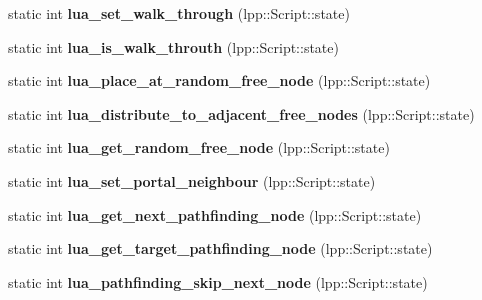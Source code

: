 \begin{DoxyCompactItemize}
\item 
static int {\bfseries lua\+\_\+set\+\_\+walk\+\_\+through} (lpp\+::\+Script\+::state)\hypertarget{class_lua_interface_a47ead731655af1ce33519f92667daf43}{}\label{class_lua_interface_a47ead731655af1ce33519f92667daf43}

\item 
static int {\bfseries lua\+\_\+is\+\_\+walk\+\_\+throuth} (lpp\+::\+Script\+::state)\hypertarget{class_lua_interface_ab39a1407244b62d9abbbbe49570dd303}{}\label{class_lua_interface_ab39a1407244b62d9abbbbe49570dd303}

\item 
static int {\bfseries lua\+\_\+place\+\_\+at\+\_\+random\+\_\+free\+\_\+node} (lpp\+::\+Script\+::state)\hypertarget{class_lua_interface_ac2e21719b40a3c50df8a9b1771355c68}{}\label{class_lua_interface_ac2e21719b40a3c50df8a9b1771355c68}

\item 
static int {\bfseries lua\+\_\+distribute\+\_\+to\+\_\+adjacent\+\_\+free\+\_\+nodes} (lpp\+::\+Script\+::state)\hypertarget{class_lua_interface_ad6082bc7210da368ac5cf11448b0abb3}{}\label{class_lua_interface_ad6082bc7210da368ac5cf11448b0abb3}

\item 
static int {\bfseries lua\+\_\+get\+\_\+random\+\_\+free\+\_\+node} (lpp\+::\+Script\+::state)\hypertarget{class_lua_interface_a04f2f2bf343b982ef51331a124b5afde}{}\label{class_lua_interface_a04f2f2bf343b982ef51331a124b5afde}

\item 
static int {\bfseries lua\+\_\+set\+\_\+portal\+\_\+neighbour} (lpp\+::\+Script\+::state)\hypertarget{class_lua_interface_addf5d84a18d681765986b04d58551967}{}\label{class_lua_interface_addf5d84a18d681765986b04d58551967}

\item 
static int {\bfseries lua\+\_\+get\+\_\+next\+\_\+pathfinding\+\_\+node} (lpp\+::\+Script\+::state)\hypertarget{class_lua_interface_a16e72abf5790718980748059bde8ebcd}{}\label{class_lua_interface_a16e72abf5790718980748059bde8ebcd}

\item 
static int {\bfseries lua\+\_\+get\+\_\+target\+\_\+pathfinding\+\_\+node} (lpp\+::\+Script\+::state)\hypertarget{class_lua_interface_a39a0f270ce4c84cfa87d1a8ec589f3b7}{}\label{class_lua_interface_a39a0f270ce4c84cfa87d1a8ec589f3b7}

\item 
static int {\bfseries lua\+\_\+pathfinding\+\_\+skip\+\_\+next\+\_\+node} (lpp\+::\+Script\+::state)\hypertarget{class_lua_interface_a75b8a75e4d172634f8858b59c52c83b7}{}\label{class_lua_interface_a75b8a75e4d172634f8858b59c52c83b7}


\end{DoxyCompactItemize}
